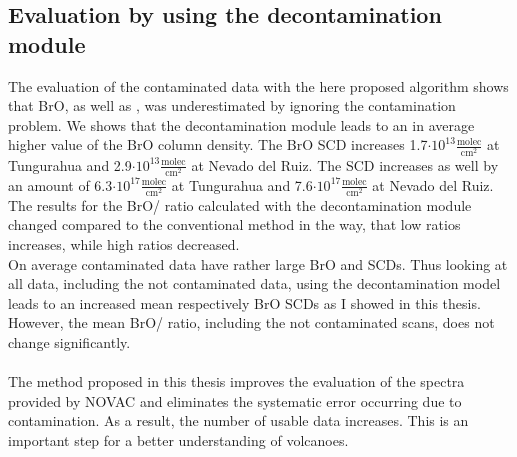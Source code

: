 \documentclass  [
  paper    = a4,
  BCOR     = 10mm,
  twoside,
  fontsize = 12pt,
  fleqn,
  toc      = bibnumbered,
  toc      = listofnumbered,
  numbers  = noendperiod,
  headings = normal,
  listof   = leveldown,
  version  = 3.03
]                                       {scrreprt}
\begin{document}
\subsection*{Evaluation by using the decontamination module} 
The evaluation of the contaminated data with the here proposed algorithm shows that BrO, as well as , was underestimated by ignoring the contamination problem.
We shows that the decontamination module leads to an in average higher value of the BrO column density. The BrO SCD increases 1.7$\cdot 10^{13}\frac{\text{molec}}{\text{cm}^2}$ at Tungurahua and 2.9$\cdot 10^{13}\frac{\text{molec}}{\text{cm}^2}$ at Nevado del Ruiz. The  SCD increases as well by an amount of 6.3$\cdot 10^{17}\frac{\text{molec}}{\text{cm}^2}$ at Tungurahua and 7.6$\cdot 10^{17}\frac{\text{molec}}{\text{cm}^2}$ at Nevado del Ruiz. The results for the BrO/ ratio calculated with the decontamination module changed compared to the conventional method in the way, that low ratios increases, while high ratios decreased.\\
On average contaminated data have rather large BrO and  SCDs. Thus looking at all data, including the not contaminated data, using the decontamination model leads to an increased mean  respectively BrO SCDs as I showed in this thesis.
However, the mean BrO/ ratio, including the not contaminated scans, does not change significantly.\\
\\
The method proposed in this thesis improves the evaluation of the spectra provided by NOVAC and eliminates the systematic error occurring due to contamination. As a result, the number of usable data increases. This is an important step for a better understanding of volcanoes.

	
\end{document}
